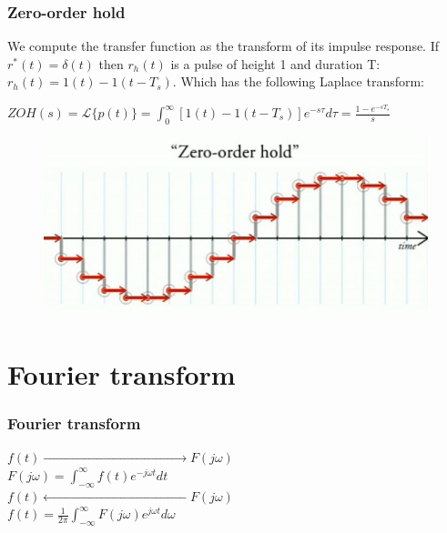 \begin{frame}
	\frametitle{Zero-order hold}
	We compute the transfer function as the transform of its impulse response. If $r^*(t)=\delta(t)$ then $r_h(t)$ is a pulse of height 1 and duration T: $r_h(t) = 1(t) - 1(t-T_s)$. Which has the following Laplace transform:\\
	\vspace{-0.5em}
	\begin{center}
		$ZOH(s)=\mathcal{L}\{p(t)\} = \int_{0}^{\infty} [1(t)-1(t-T_s)]e^{-s\tau}d\tau = \frac{1-e^{-sT_s}}{s}$
	\end{center}
	\vspace{-1.3em}
	\begin{figure}
		\includegraphics[width=0.6\linewidth]{zoh}
	\end{figure}
\end{frame}

\section{Fourier transform}

\begin{frame}
	\frametitle{Fourier transform}
	\begin{center}
		\Large{
		$f(t)\xrightarrow{\qquad \qquad \qquad \qquad \qquad \qquad \qquad \qquad}F(j\omega)$\\
		$F(j\omega) = \int_{-\infty}^{\infty} f(t)e^{-j\omega t} dt$\\
		\bigskip
		$f(t)\xleftarrow{\qquad \qquad \qquad \qquad \qquad \qquad \qquad \qquad}F(j\omega)$\\
		$f(t) = \frac{1}{2\pi} \int_{-\infty}^{\infty} F(j\omega) e^{j\omega t} d\omega$}
	\end{center}
\end{frame}

